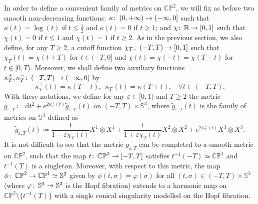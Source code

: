 \documentclass{article}
\numberwithin{equation}{section}        %
\theoremstyle{bfnote}
\theoremstyle{definition}
\theoremstyle{bfremark}
\newcommand{\col}{\colon \thinspace}        %
\newcommand{\R}{\mathbb{R}}                 %
\newcommand{\Sp}{\mathbb{S}}                %
\newcommand{\diff}{\mathrm{d}}                      %
\begin{document}
In order to define a convenient family of metrics on $\mathbb{CP}^2$, we will fix as before two smooth non-decreasing functions: $\kappa \col (0,+\infty) \to (-\infty,0]$ such that $\kappa(t) = \log(t)$ if $t \leq \frac{1}{2}$ and $\kappa(t) = 0$ if $t \geq 1$; and $\chi \col \R \to [0,1]$ such that $\chi(t) = 0$ if $t \leq 1$ and $\chi(t) = 1$ if $t \geq 2$. As in the previous section, we also define, for any $T \geq 2$, a cutoff function $\chi_T \col (-T,T) \to [0,1]$ such that $\chi_T(t) = \chi(t+T)$ for $t \in (-T,0]$ and $\chi(t) = \chi(-t) = \chi(T-t)$ for $t \in [0,T)$. Moreover, we shall define two auxiliary functions $\kappa^+_T, \kappa^-_T \col (-T,T) \to (-\infty,0]$ by
\begin{equation*}
    \kappa^+_T(t) = \kappa(T-t), ~~ \kappa^-_T(t) = \kappa(T+t), ~~~~ \forall t \in (-T,T) .
\end{equation*}
With these notations, we define for any $\varepsilon \in [0,1)$ and $T \geq 2$ the metric $g_{\varepsilon,T} \coloneqq \diff t^2 + e^{2\kappa^+_T(t)} \tilde{g}_{\varepsilon,T}(t)$ on $(-T,T) \times \Sp^3$, where $\tilde{g}_{\varepsilon,T}(t)$ is the family of metrics on $\Sp^3$ defined as
\begin{equation*}
    \tilde{g}_{\varepsilon,T}(t) \coloneqq \frac{1}{1-\varepsilon\chi_T(t)} X^1 \otimes X^1 + \frac{1}{1 + \varepsilon\chi_T(t)} X^2 \otimes X^2 + e^{2\kappa^-_T(t)} X^3 \otimes X^3 .
\end{equation*}
It is not difficult to see that the metric $g_{\varepsilon,T}$ can be completed to a smooth metric on $\mathbb{CP}^2$, such that the map $t \col \mathbb{CP}^2 \to [-T,T]$ satisfies $t^{-1}(-T) \simeq \mathbb{CP}^1$ and $t^{-1}(T)$ is a singleton. Moreover, with respect to this metric, the map $\phi \col \mathbb{CP}^2 \to \mathbb{CP}^1 \simeq \Sp^2$ given by $\phi(t,\sigma) = \varphi(\sigma)$ for all $(t,\sigma) \in (-T,T) \times \Sp^3$ (where $\varphi \col \Sp^3 \to \Sp^2$ is the Hopf fibration) extends to a harmonic map on $\mathbb{CP}^2 \setminus \{t^{-1}(T)\}$ with a single conical singularity modelled on the Hopf fibration.
\end{document}
